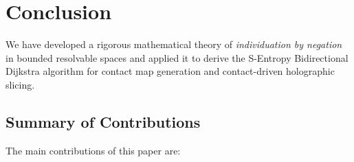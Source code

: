 \documentclass[twocolumn]{article}
\theoremstyle{plain}
\theoremstyle{definition}
\begin{document}
\section{Conclusion}
\label{sec:conclusion}

We have developed a rigorous mathematical theory of \emph{individuation by
negation} in bounded resolvable spaces and applied it to derive the S-Entropy
Bidirectional Dijkstra algorithm for contact map generation and contact-driven
holographic slicing.

\subsection{Summary of Contributions}

The main contributions of this paper are:
\end{document}

